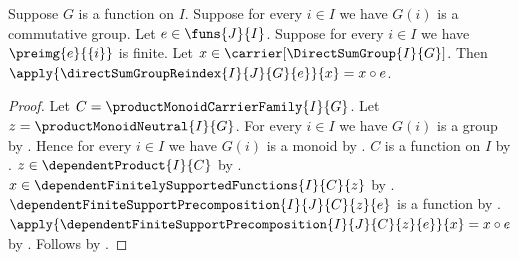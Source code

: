 \begin{proposition}\label{direct_sum_group_reindex_apply}
    Suppose $G$ is a function on $I$.
    Suppose for every $i\in I$ we have $G(i)$ is a commutative group.
    Let $e\in\funs{J}{I}$.
    Suppose for every $i\in I$ we have $\preimg{e}{\{i\}}$ is finite.
    Let $x\in\carrier[\DirectSumGroup{I}{G}]$.
    Then $\apply{\directSumGroupReindex{I}{J}{G}{e}}{x}=x\circ e$.
\end{proposition}
\begin{proof}
    Let $C=\productMonoidCarrierFamily{I}{G}$.
    Let $z=\productMonoidNeutral{I}{G}$.
    For every $i\in I$ we have $G(i)$ is a group by
        .
    Hence for every $i\in I$ we have $G(i)$ is a monoid by
        .
    $C$ is a function on $I$ by
        .
    $z\in\dependentProduct{I}{C}$ by
        .
    $x\in\dependentFinitelySupportedFunctions{I}{C}{z}$ by
        .
    $\dependentFiniteSupportPrecomposition{I}{J}{C}{z}{e}$
        is a function by
        .
    $\apply{\dependentFiniteSupportPrecomposition
        {I}{J}{C}{z}{e}}{x}=x\circ e$ by
        .
    Follows by .
\end{proof}

